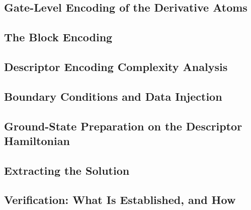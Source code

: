 \subsection{Gate-Level Encoding of the Derivative Atoms}
\label{sec:descriptor-atoms}

\subsection{The Block Encoding}
\label{sec:descriptor-block-encoding}

\subsection{Descriptor Encoding Complexity Analysis}
\label{sec:descriptor-cost}

\subsection{Boundary Conditions and Data Injection}
\label{sec:descriptor-bc}

\subsection{Ground-State Preparation on the Descriptor Hamiltonian}

\subsection{Extracting the Solution}

\subsection{Verification: What Is Established, and How}
